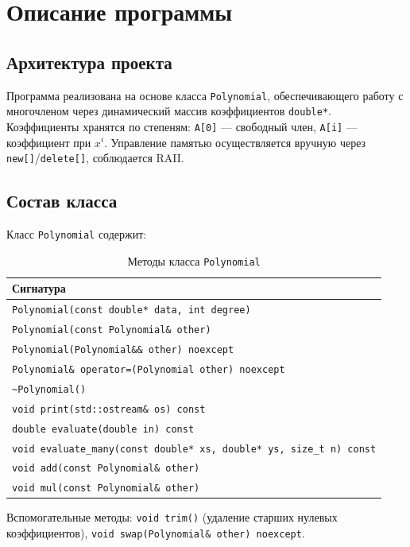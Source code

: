 \section{Описание программы}

\subsection{Архитектура проекта}

Программа реализована на основе класса \texttt{Polynomial}, обеспечивающего работу с многочленом через динамический массив коэффициентов \texttt{double*}. Коэффициенты хранятся по степеням: \texttt{A[0]} — свободный член, \texttt{A[i]} — коэффициент при $x^i$. Управление памятью осуществляется вручную через \texttt{new[]}/\texttt{delete[]}, соблюдается RAII.

\subsection{Состав класса}

Класс \texttt{Polynomial} содержит:

\begin{table}[htbp]
\centering
\caption{Методы класса \texttt{Polynomial}}
\begin{tabular}{@{}>{\raggedright\arraybackslash}p{}@{}}
\hline
\textbf{Сигнатура} \\
\hline
\texttt{Polynomial(const double* data, int degree)} \\
\texttt{Polynomial(const Polynomial\& other)} \\
\texttt{Polynomial(Polynomial\&\& other) noexcept} \\
\texttt{Polynomial\& operator=(Polynomial other) noexcept} \\
\texttt{\~{}Polynomial()} \\
\texttt{void print(std::ostream\& os) const} \\
\texttt{double evaluate(double in) const} \\
\texttt{void evaluate\_many(const double* xs, double* ys, size\_t n) const} \\
\texttt{void add(const Polynomial\& other)} \\
\texttt{void mul(const Polynomial\& other)} \\
\hline
\end{tabular}
\end{table}

Вспомогательные методы: \texttt{void trim()} (удаление старших нулевых коэффициентов), \texttt{void swap(Polynomial\& other) noexcept}.

